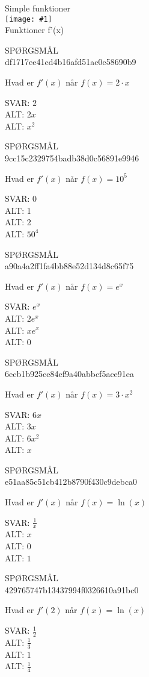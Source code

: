 \documentclass[]{article}
\newenvironment{question}[2]{SPØRGSMÅL\\}{\hspace{50px}}
\newcommand{\name}[1]{{\huge #1}\\}
\newcommand{\tag}[1]{#1}
\newcommand{\cover}[1]{\texttt{[image: \#1]}\\}
\newcommand{\answer}[1]{{\color{green} SVAR: #1}\\}
\newcommand{\alt}[1]{{\color{red} ALT: #1}\\}
\begin{document}
\name{Simple funktioner}
\cover{tangent.png}
\tag{Funktioner}
\tag{f'(x)}

\begin{question}{multi}\id{df1717ee41cd4b16afd51ac0e58690b9}
	
	Hvad er $f'(x)$ når $f(x)=2\cdot x$
	
	\answer{$2$}
	\alt{$2x$}
	\alt{$x^2$}
	
	\end{question}
	
	\begin{question}{multi}\id{9cc15c2329754badb38d0c56891e9946}
		
		Hvad er $f'(x)$ når $f(x)=10^5$
		
		\answer{$0$}
		\alt{1}
		\alt{2}
		\alt{$50^4$}
		
	\end{question}
	
	\begin{question}{multi}\id{a90a4a2ff1fa4bb88e52d134d8c65f75}
		
		Hvad er $f'(x)$ når $f(x)=e^x$
		
		\answer{$e^x$}
		\alt{$2e^x$}
		\alt{$xe^x$}
		\alt{$0$}
		
	\end{question}
	
	\begin{question}{multi}\id{6ecb1b925ce84ef9a40abbcf5ace91ea}
		
		Hvad er $f'(x)$ når $f(x)=3\cdot x^2$
		
		\answer{$6 x$}
		\alt{$3x$}
		\alt{$6x^2$}
		\alt{$x$}
		
	\end{question}
	
	\begin{question}{multi}\id{e51aa85c51cb412b8790f430c9debca0}
		
		Hvad er $f'(x)$ når $f(x)=\ln(x)$
		
		\answer{$\frac{1}{x}$}
		\alt{$x$}
		\alt{$0$}
		\alt{$1$}
		
	\end{question}
	
	\begin{question}{multi}\id{429765747b13437994f0326610a91bc0}
		
		Hvad er $f'(2)$ når $f(x)=\ln(x)$
		
		\answer{$\frac{1}{2}$}
		\alt{$\frac{1}{3}$}
		\alt{$1$}
		\alt{$\frac{1}{4}$}
		
	\end{question}
	
\end{document}
